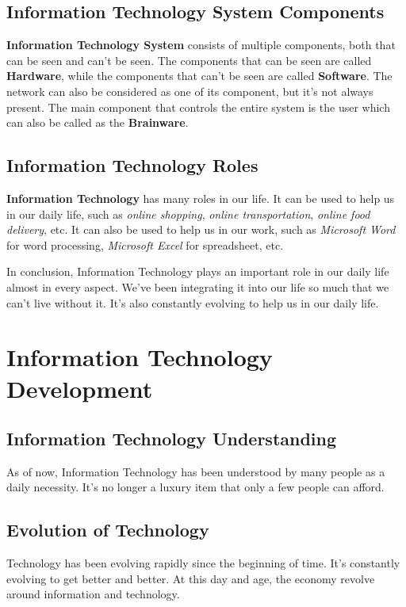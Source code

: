 \documentclass[12pt,titlepage]{article}
\begin{document}
\subsection{Information Technology System Components}
\textbf{Information Technology System} consists of multiple components, both that can be seen and can't be seen.
The components that can be seen are called \textbf{Hardware}, while the components that can't be seen are called
\textbf{Software}. The network can also be considered as one of its component, but it's not always present.
The main component that controls the entire system is the user which can also be called as the \textbf{Brainware}.

\subsection{Information Technology Roles}
\textbf{Information Technology} has many roles in our life. It can be used to help us in our daily life, such as
\textit{online shopping}, \textit{online transportation}, \textit{online food delivery}, etc. It can also be used
to help us in our work, such as \textit{Microsoft Word} for word processing, \textit{Microsoft Excel} for spreadsheet,
etc.

In conclusion, Information Technology plays an important role in our daily life almost in every aspect.
We've been integrating it into our life so much that we can't live without it. It's also constantly evolving
to help us in our daily life.

\section{Information Technology Development}
\subsection{Information Technology Understanding}
As of now, Information Technology has been understood by many people as a daily necessity.
It's no longer a luxury item that only a few people can afford.

\subsection{Evolution of Technology}
Technology has been evolving rapidly since the beginning of time. It's constantly evolving to get better and better.
At this day and age, the economy revolve around information and technology.
\end{document}
